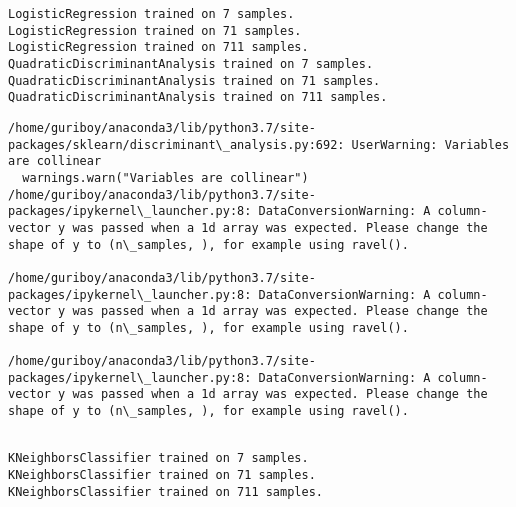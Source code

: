 \documentclass[11pt]{article}
\begin{document}
\begin{Verbatim}[commandchars=\\\{\}]
    \end{Verbatim}

    \begin{Verbatim}[commandchars=\\\{\}]
LogisticRegression trained on 7 samples.
LogisticRegression trained on 71 samples.
LogisticRegression trained on 711 samples.
QuadraticDiscriminantAnalysis trained on 7 samples.
QuadraticDiscriminantAnalysis trained on 71 samples.
QuadraticDiscriminantAnalysis trained on 711 samples.

    \end{Verbatim}

    \begin{Verbatim}[commandchars=\\\{\}]
/home/guriboy/anaconda3/lib/python3.7/site-packages/sklearn/discriminant\_analysis.py:692: UserWarning: Variables are collinear
  warnings.warn("Variables are collinear")
/home/guriboy/anaconda3/lib/python3.7/site-packages/ipykernel\_launcher.py:8: DataConversionWarning: A column-vector y was passed when a 1d array was expected. Please change the shape of y to (n\_samples, ), for example using ravel().
  
/home/guriboy/anaconda3/lib/python3.7/site-packages/ipykernel\_launcher.py:8: DataConversionWarning: A column-vector y was passed when a 1d array was expected. Please change the shape of y to (n\_samples, ), for example using ravel().
  
/home/guriboy/anaconda3/lib/python3.7/site-packages/ipykernel\_launcher.py:8: DataConversionWarning: A column-vector y was passed when a 1d array was expected. Please change the shape of y to (n\_samples, ), for example using ravel().
  

    \end{Verbatim}

    \begin{Verbatim}[commandchars=\\\{\}]
KNeighborsClassifier trained on 7 samples.
KNeighborsClassifier trained on 71 samples.
KNeighborsClassifier trained on 711 samples.

    \end{Verbatim}

    \begin{center}
    \end{center}
    { \hspace*{\fill} \\}
    
\end{document}

